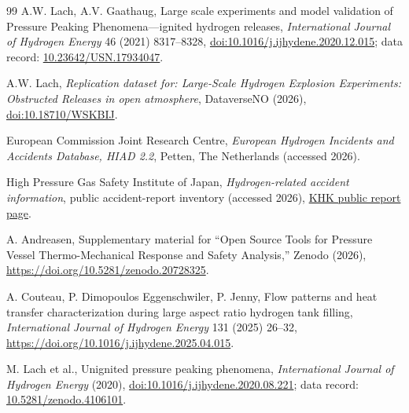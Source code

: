 \documentclass[12pt,a4paper]{article}
\begin{document}
\begin{thebibliography}{99}
A.W. Lach, A.V. Gaathaug, Large scale experiments and model validation of
Pressure Peaking Phenomena---ignited hydrogen releases, \textit{International
Journal of Hydrogen Energy} 46 (2021) 8317--8328,
\href{https://doi.org/10.1016/j.ijhydene.2020.12.015}{doi:10.1016/j.ijhydene.2020.12.015};
data record: \href{https://doi.org/10.23642/USN.17934047}{10.23642/USN.17934047}.

A.W. Lach, \textit{Replication dataset for: Large-Scale Hydrogen Explosion
Experiments: Obstructed Releases in open atmosphere}, DataverseNO (2026),
\href{https://doi.org/10.18710/WSKBIJ}{doi:10.18710/WSKBIJ}.

European Commission Joint Research Centre, \textit{European Hydrogen Incidents
and Accidents Database, HIAD 2.2}, Petten, The Netherlands (accessed 2026).

High Pressure Gas Safety Institute of Japan, \textit{Hydrogen-related accident
information}, public accident-report inventory (accessed 2026),
\href{https://www.khk.or.jp/hydrogen/accident_information.html}{KHK public
report page}.

A. Andreasen, Supplementary material for ``Open Source Tools for Pressure Vessel
Thermo-Mechanical Response and Safety Analysis,'' Zenodo (2026),
\url{https://doi.org/10.5281/zenodo.20728325}.

A. Couteau, P. Dimopoulos Eggenschwiler, P. Jenny, Flow patterns and heat
transfer characterization during large aspect ratio hydrogen tank filling,
\textit{International Journal of Hydrogen Energy} 131 (2025) 26--32,
\url{https://doi.org/10.1016/j.ijhydene.2025.04.015}.

M. Lach et al., Unignited pressure peaking phenomena, \textit{International
Journal of Hydrogen Energy} (2020),
\href{https://doi.org/10.1016/j.ijhydene.2020.08.221}{doi:10.1016/j.ijhydene.2020.08.221};
data record: \href{https://doi.org/10.5281/zenodo.4106101}{10.5281/zenodo.4106101}.

\end{thebibliography}
\end{document}
